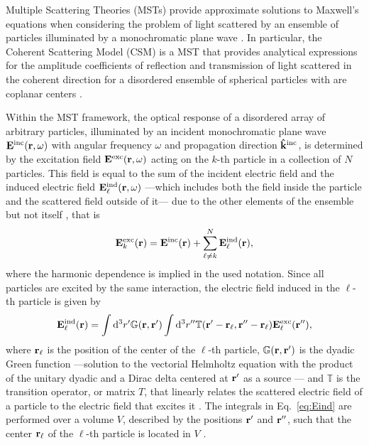 
Multiple Scattering Theories (MSTs) provide approximate solutions to Maxwell's equations when considering the problem of light scattered by an ensemble of particles illuminated by a monochromatic plane wave \cite{loiko_monolayers_1998,reyes2018analytical}. In particular, the Coherent Scattering Model (CSM) is a MST that provides analytical expressions for the amplitude coefficients of reflection and transmission of light scattered in the coherent direction for a disordered ensemble of spherical particles with are coplanar centers \cite{barrera_coherent_2003,garcia2012multiple,reyes2018analytical}. 

Within the MST framework, the optical response of a disordered array of arbitrary particles, illuminated by an incident monochromatic plane wave $\vb{E}^\text{inc}(\vb{r},\omega)$ with angular frequency $\omega$ and propagation direction $\vu{k}^\text{inc}$, is determined by the excitation field $\vb{E}^\text{exc}(\vb{r},\omega)$ acting on the $k$-th particle in a collection of $N$ particles. This field is equal to the sum of the incident electric field and the induced electric field $\vb{E}^\text{ind}_\ell(\vb{r},\omega)$ ---which includes both the field inside the particle and the scattered field outside of it--- due to the other elements of the ensemble but not itself \cite{garcia2012multiple,barrera_coherent_2003}, that is
%
\begin{align}
	\vb{E}^\text{exc}_k(\vb{r}) = \vb{E}^\text{inc}(\vb{r}) + \sum_{\ell\neq k}^N \vb{E}^\text{ind}_\ell(\vb{r}),
	\label{eq:Eexc}
\end{align}
%
where the harmonic dependence is implied in the used notation. Since all particles are excited by the same interaction, the electric field induced in the $\ell$-th particle is given by \cite{garcia2012multiple,barrera_coherent_2003}
%
\begin{align}
	\vb{E}^\text{ind}_\ell(\vb{r}) =
	\int\dd^3 r' \mathbb{G}(\vb{r},\vb{r}')
	\int\dd^3 r''\mathbb{T}(\vb{r}'-\vb{r}_\ell,\vb{r}''-\vb{r}_\ell) \vb{E}_\ell^\text{exc}(\vb{r}''),
	\label{eq:Eind}
\end{align}
%
where $\vb{r}_\ell$ is the position of the center of the $\ell$-th particle, $\mathbb{G}(\vb{r},\vb{r}')$ is the dyadic Green function ---solution to the vectorial Helmholtz equation with the product of the unitary dyadic and a Dirac delta centered at $\vb{r}'$ as a source \cite{tsang_scattering_2000}--- and $\mathbb{T}$ is the transition operator, or matrix $T$, that linearly relates the scattered electric field of a particle to the electric field that excites it \cite{tsang_scattering_2000}. The integrals in Eq.~\eqref{eq:Eind} are performed over a  volume $V$, described by the positions $\vb{r}'$ and $\vb{r}''$, such that the center $\vb{r}_\ell$ of the $\ell$-th particle is located in $V$ \cite{barrera_coherent_2003}.

